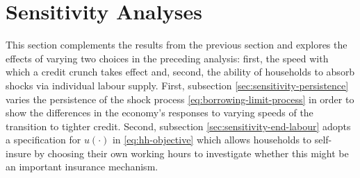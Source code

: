 \documentclass[12pt]{article} %
\numberwithin{equation}{section} %
\numberwithin{figure}{section}
\numberwithin{table}{section}
\begin{document}



\section{Sensitivity Analyses}
\label{sec:sensitivity}

This section complements the results from the previous section and explores the effects of varying two choices in the preceding analysis: first, the speed with which a credit crunch takes effect and, second, the ability of households to absorb shocks via individual labour supply. First, subsection \ref{sec:sensitivity-persistence} varies the persistence of the shock process \eqref{eq:borrowing-limit-process} in order to show the differences in the economy's responses to varying speeds of the transition to tighter credit. Second, subsection \ref{sec:sensitivity-end-labour} adopts a specification for $u( \cdot )$ in \eqref{eq:hh-objective} which allows households to self-insure by choosing their own working hours to investigate whether this might be an important insurance mechanism.
\end{document}
